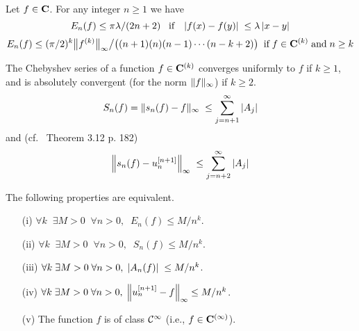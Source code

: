 \smallskip{}

\noindent 
Let $f \in {\bf C}$. For any integer $n \geq 1$ we have 
\begin{equation} \label{F 5.2.5}
E_n(f) \leq \pi \lambda /(2n+2) \; \; \; \hbox{if} \; \; \; \left|{f(x)-f(y)}\right|\;  \leq \lambda \left|{x-y}\right|
\end{equation}
\begin{equation} \label{F 5.2.6}
E_n(f) \leq (\pi /2)^k \big\lVert  f^{(k)}  \big\rVert_{\infty} \big/ \big((n+1)(n)(n-
1)\cdots(n-k+2)\big) \; \; \hbox{if} \; f \in {\bf C}^{(k)} \; \hbox{and} \; n\geq k
\end{equation}

\smallskip{} 


\noindent 
The Chebyshev series of a function $f \in {\bf C}^{(k)}$ converges uniformly to $f$ if $k \geq 1$, and is absolutely convergent (for the norm $\lVert f \rVert_{\infty}$) if $k \geq 2$. 
\begin{equation} \label{F 5.2.7}
S_n(f) = \lVert  s_n(f)-f  \rVert_{\infty}\; \leq \sum_{j=n+1}^{\infty} \left|{A_j}\right|
\end{equation}
and (cf.\ \cite{Ri} Theorem 3.12 p. 182)
\begin{equation} \label{F 5.2.8}
\Big\lVert  s_n(f)- u_n^{[n+1]}  \Big\rVert_\infty\; \leq \sum_{j=n+2}^\infty \left|{A_j}\right| 
\end{equation}

\smallskip{} 

\noindent 
The following properties are equivalent. 
\begin{itemize}\itemsep2pt

\item [(i)] 
$\forall k \; \; \exists M > 0 \; \; \forall n> 0, \; \; E_n(f) \leq M/n^k$. 

\item [(ii)]
$\forall k \; \; \exists M > 0 \; \; \forall n> 0, \; \; S_n(f) \leq M/n^k$.

\item [(iii)]
$\forall k \; \exists M > 0 \; \forall n> 0, \; \left|{A_n(f)}\right|\; \leq M/n^k$.

\item [(iv)] 
$\forall k \; \exists M > 0 \; \forall n> 0, \; \Big\lVert  u_n^{[n+1]} - f  \Big\rVert_{\infty} \leq M/n^k$.

\item [(v)] 
The function $f$ is of class ${{\cal C}}^{\infty}$ (i.e., $f \in {\bf C}^{(\infty)}$).
\end{itemize}


